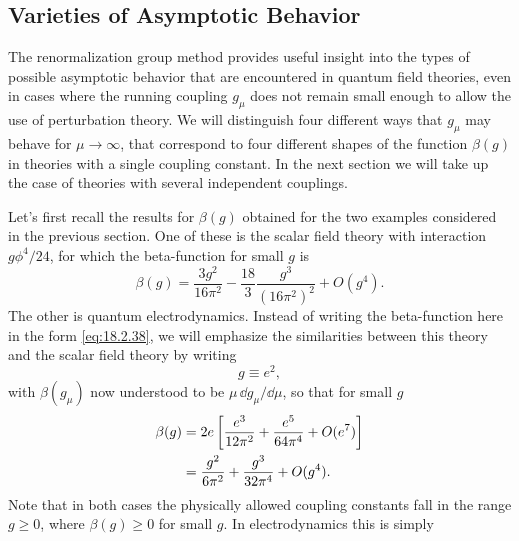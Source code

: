 \subsection{Varieties of Asymptotic Behavior}

The renormalization group method provides useful insight into the types
of possible asymptotic behavior that are encountered in quantum field
theories, even in cases where the running coupling $g_\mu$ does not remain
small enough to allow the use of perturbation theory. We will distinguish
four different ways that $g_\mu$ may behave for $\mu\to\infty$, that correspond to
four different shapes of the function $\beta(g)$ in theories with a single coupling
constant. In the next section we will take up the case of theories with
several independent couplings.

Let's first recall the results for $\beta(g)$ obtained for the two examples
considered in the previous section. One of these is the scalar field theory
with interaction $g\phi^4/24$, for which the beta-function for small $g$ is
\begin{equation}
\beta(g)=\frac{3g^2}{16\pi^2}-\frac{18}{3}\frac{g^3}{(16\pi^2)^2}+O(g^4).
\label{eq:18.3.1}
\end{equation}
The other is quantum electrodynamics. Instead of writing the beta-function
here in the form \eqref{eq:18.2.38}, we will emphasize the similarities
between this theory and the scalar field theory by writing
\begin{equation}
g\equiv e^2,
\label{eq:18.3.2}
\end{equation}
with $\beta(g_\mu)$ now understood to be $\mu\,\dd g_\mu/\dd\mu$, so that for small $g$
\begin{align}
\beta(g)
&=2e\left[\frac{e^3}{12\pi^2}+\frac{e^5}{64\pi^4}+O(e^7)\right] \notag\\
&=\frac{g^2}{6\pi^2}+\frac{g^3}{32\pi^4}+O(g^4).
\label{eq:18.3.3}
\end{align}
Note that in both cases the physically allowed coupling constants fall in the
range $g\geq0$, where $\beta(g)\geq0$ for small $g$. In electrodynamics this is simply

